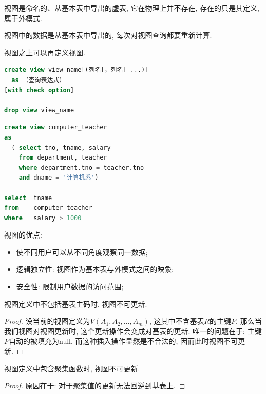 \begin{definition}[视图]
  视图是命名的、从基本表中导出的虚表, 它在物理上并不存在, 存在的只是其定义, 属于外模式.

  视图中的数据是从基本表中导出的, 每次对视图查询都要重新计算.

  视图之上可以再定义视图.
\end{definition}

\begin{lstlisting}[language=SQL]
create view view_name[(列名[，列名] ...)]
  as （查询表达式）
[with check option]

drop view view_name
\end{lstlisting}

\begin{lstlisting}[language=SQL]
create view computer_teacher
as
  ( select tno, tname, salary
    from department, teacher
    where department.tno = teacher.tno
    and dname = '计算机系')

select  tname
from    computer_teacher
where   salary > 1000
\end{lstlisting}

视图的优点:
\begin{itemize}
  \item 使不同用户可以从不同角度观察同一数据;
  \item 逻辑独立性: 视图作为基本表与外模式之间的映象;
  \item 安全性: 限制用户数据的访问范围;
\end{itemize}

\begin{theorem}
  视图定义中不包括基表主码时, 视图不可更新.
\end{theorem}

\begin{proof}
  设当前的视图定义为$V(A_1,A_2,...,A_m)$, 这其中不含基表$R$的主键$P$. 那么当我们视图对视图更新时, 这个更新操作会变成对基表的更新. 唯一的问题在于: 主键$P$自动的被填充为null, 而这种插入操作显然是不合法的, 因而此时视图不可更新.
\end{proof}

\begin{theorem}
  视图定义中包含聚集函数时, 视图不可更新.
\end{theorem}

\begin{proof}
  原因在于: 对于聚集值的更新无法回逆到基表上.
\end{proof}

